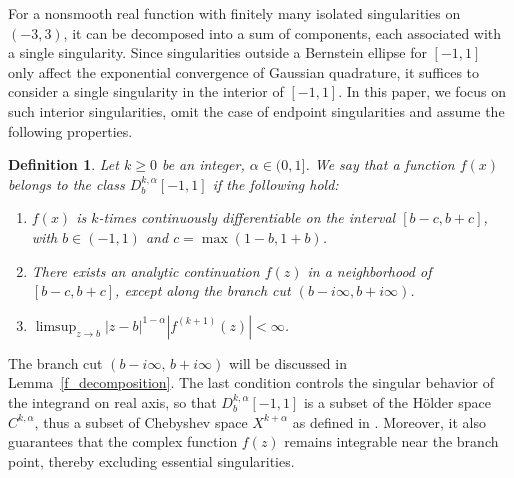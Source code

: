 \documentclass[11pt]{article}
\newtheorem{definition}{Definition}
\begin{document}
For a nonsmooth real function with finitely many isolated singularities on $(-3,3)$, it can be decomposed into a sum of components, each associated with a single singularity. Since singularities outside a Bernstein ellipse for $[-1,1]$ only affect the exponential convergence of Gaussian quadrature, it suffices to consider a single singularity in the interior of $[-1,1]$. In this paper, we focus on such interior singularities, omit the case of endpoint singularities and assume the following properties.
\begin{definition} \label{definition}
Let $k\geq 0$ be an integer, $\alpha \in (0,1]$. We say that a function $f(x)$ belongs to the class $D_b^{k,\alpha}[-1,1]$ if the following hold:  
\begin{enumerate}
    \item   
    $f(x)$ is $k$-times continuously differentiable on the interval $[b-c,b+c]$, with $b\in (-1,1)$ and $c=\max(1-b,1+b)$.
    \item There exists an analytic continuation $f(z)$ in a neighborhood of $[b-c,b+c]$, except along the branch cut $(b- i\infty, b+i\infty)$.
    \item $\displaystyle \limsup_{z \to b} |z-b|^{1-\alpha} |f^{(k+1)}(z)| < \infty$.
\end{enumerate}
\end{definition}
The branch cut $(b - i\infty,\, b + i\infty)$ will be discussed in Lemma~\ref{f_decomposition}. The last condition controls the singular behavior of the integrand on real axis, so that $D_b^{k,\alpha}[-1,1]$ is a subset of the H\"older space $C^{k,\alpha}$, thus a subset of Chebyshev space $X^{k+\alpha}$ as defined in \cite{trefethen2019approximation, xiang2016improved}. Moreover, it also guarantees that the complex function $f(z)$ remains integrable near the branch point,  thereby excluding essential singularities.
\end{document}
